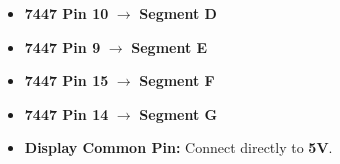 \documentclass[12pt, a4paper]{article}
\begin{document}
\begin{hardwarebox}
\begin{itemize}[itemsep=0.1em]
																																																																																																																																																																													          \item \textbf{7447 Pin 10} $\rightarrow$  \textbf{Segment D}
																																																																																																																																																																														          \item \textbf{7447 Pin 9}  $\rightarrow$  \textbf{Segment E}
																																																																																																																																																																															          \item \textbf{7447 Pin 15} $\rightarrow$  \textbf{Segment F}
																																																																																																																																																																																          \item \textbf{7447 Pin 14} $\rightarrow$  \textbf{Segment G}
																																																																																																																																																																																	          \item \textbf{Display Common Pin:} Connect directly to \textbf{5V}.
																																																																																																																																																																																		      \end{itemize}
																																																																																																																																																																																		      \end{hardwarebox}

																																																																																																																																																																																		      \newpage
\end{document}
